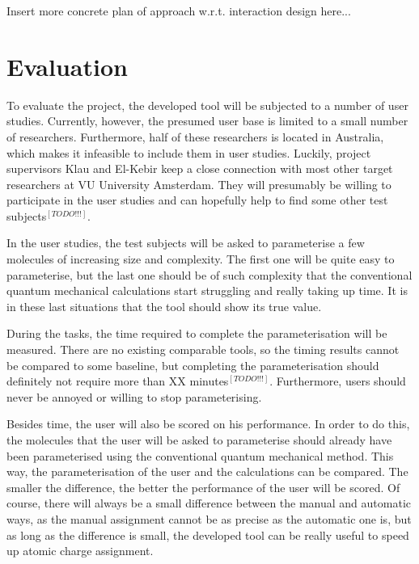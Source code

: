 Insert more concrete plan of approach w.r.t. interaction design here...


\section{Evaluation}

To evaluate the project, the developed tool will be subjected to a number of user studies. Currently, however, the presumed user base is limited to a small number of researchers. Furthermore, half of these researchers is located in Australia, which makes it infeasible to include them in user studies. Luckily, project supervisors Klau and El-Kebir keep a close connection with most other target researchers at VU University Amsterdam. They will presumably be willing to participate in the user studies and can hopefully help to find some other test subjects$^{[TODO!!!]}$.

In the user studies, the test subjects will be asked to parameterise a few molecules of increasing size and complexity. The first one will be quite easy to parameterise, but the last one should be of such complexity that the conventional quantum mechanical calculations start struggling and really taking up time. It is in these last situations that the tool should show its true value.

During the tasks, the time required to complete the parameterisation will be measured. There are no existing comparable tools, so the timing results cannot be compared to some baseline, but completing the parameterisation should definitely not require more than XX minutes$^{[TODO!!!]}$. Furthermore, users should never be annoyed or willing to stop parameterising.

Besides time, the user will also be scored on his performance. In order to do this, the molecules that the user will be asked to parameterise should already have been parameterised using the conventional quantum mechanical method. This way, the parameterisation of the user and the calculations can be compared. The smaller the difference, the better the performance of the user will be scored. Of course, there will always be a small difference between the manual and automatic ways, as the manual assignment cannot be as precise as the automatic one is, but as long as the difference is small, the developed tool can be really useful to speed up atomic charge assignment.

